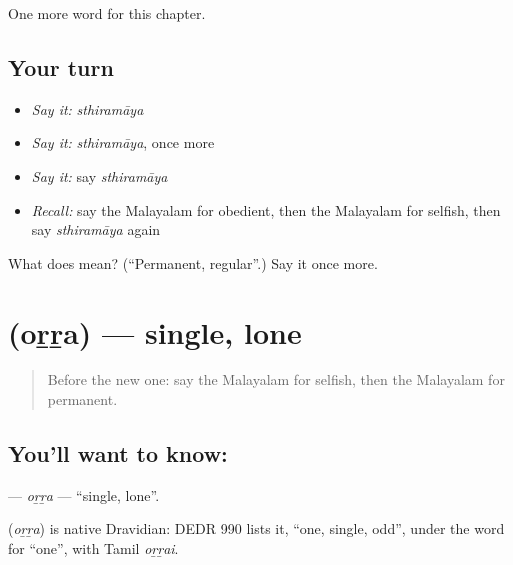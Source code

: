 \begin{grammarlens}[title={What you've built}]
One more word for this chapter.
\end{grammarlens}

\subsection*{Your turn}
\begin{itemize}
\raggedright
  \item \emph{Say it:} \emph{sthiramāya}
  \item \emph{Say it:} \emph{sthiramāya}, once more
  \item \emph{Say it:} say \emph{sthiramāya}
  \item \emph{Recall:} say the Malayalam for obedient, then the Malayalam for selfish, then say \emph{sthiramāya} again
\end{itemize}

\begin{tcolorbox}[breakable,colback=teal!4,colframe=teal!35!black,title={Before you move on}]
What does  mean? (\textquotedblleft{}Permanent, regular\textquotedblright{}.) Say it once more.
\end{tcolorbox}
\section[\texorpdfstring{\ml{ഒറ്റ} (oṟṟa)}{ഒറ്റ (oṟṟa)}]{ (oṟṟa) — single, lone}

\label{lesson:ML-C206-orra}



\begin{quote}
Before the new one: say the Malayalam for selfish, then the Malayalam for permanent.
\end{quote}

\subsection*{You'll want to know: }
\textbf{} — \emph{oṟṟa} — \textquotedblleft{}single, lone\textquotedblright{}.

\begin{cousinweb}
\textbf{} (\emph{oṟṟa}) is native Dravidian: DEDR 990 lists it, \textquotedblleft{}one, single, odd\textquotedblright{}, under the word for \textquotedblleft{}one\textquotedblright{}, with Tamil \emph{oṟṟai}.
\end{cousinweb}

